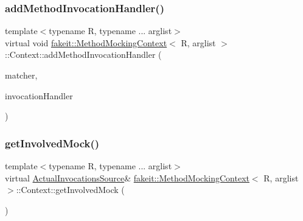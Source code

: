 \mbox{\label{structfakeit_1_1MethodMockingContext_1_1Context_a87b3a2d95daf8aaa2ae56b49e032c275}} 
\subsubsection{\texorpdfstring{addMethodInvocationHandler()}{addMethodInvocationHandler()}\hspace{0.1cm}{\footnotesize\ttfamily [9/9]}}
{\footnotesize\ttfamily template$<$typename R, typename ... arglist$>$ \\
virtual void \mbox{\hyperlink{classfakeit_1_1MethodMockingContext}{fakeit\+::\+Method\+Mocking\+Context}}$<$ R, arglist $>$\+::Context\+::add\+Method\+Invocation\+Handler (\begin{DoxyParamCaption}\item[{typename \mbox{\hyperlink{structfakeit_1_1ActualInvocation}{Actual\+Invocation}}$<$ arglist... $>$\+::Matcher $\ast$}]{matcher,  }\item[{\mbox{\hyperlink{structfakeit_1_1ActualInvocationHandler}{Actual\+Invocation\+Handler}}$<$ R, arglist... $>$ $\ast$}]{invocation\+Handler }\end{DoxyParamCaption})\hspace{0.3cm}{\ttfamily [pure virtual]}}

\mbox{\label{structfakeit_1_1MethodMockingContext_1_1Context_aab7f9487475b01f85e81b76cdf6c4860}} 
\subsubsection{\texorpdfstring{getInvolvedMock()}{getInvolvedMock()}\hspace{0.1cm}{\footnotesize\ttfamily [1/9]}}
{\footnotesize\ttfamily template$<$typename R, typename ... arglist$>$ \\
virtual \mbox{\hyperlink{structfakeit_1_1ActualInvocationsSource}{Actual\+Invocations\+Source}}\& \mbox{\hyperlink{classfakeit_1_1MethodMockingContext}{fakeit\+::\+Method\+Mocking\+Context}}$<$ R, arglist $>$\+::Context\+::get\+Involved\+Mock (\begin{DoxyParamCaption}{ }\end{DoxyParamCaption})\hspace{0.3cm}{\ttfamily [pure virtual]}}


